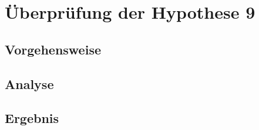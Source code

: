 \label{chap:hypothese9}
\chapter{Überprüfung der Hypothese 9}

\section{Vorgehensweise}

\section{Analyse}

\section{Ergebnis}
